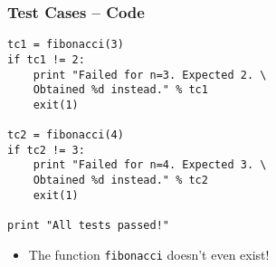 \documentclass[17pt,compress]{beamer}
\begin{document}
\begin{frame}[fragile]
  \frametitle{Test Cases -- Code}
\small
{
\begin{lstlisting}
tc1 = fibonacci(3)
if tc1 != 2:
    print "Failed for n=3. Expected 2. \
    Obtained %d instead." % tc1
    exit(1)

tc2 = fibonacci(4)
if tc2 != 3:
    print "Failed for n=4. Expected 3. \
    Obtained %d instead." % tc2
    exit(1)

print "All tests passed!"
\end{lstlisting}
}
\begin{itemize}
\item The function \texttt{fibonacci} doesn't even exist!
\end{itemize}
\end{frame}
\end{document}
